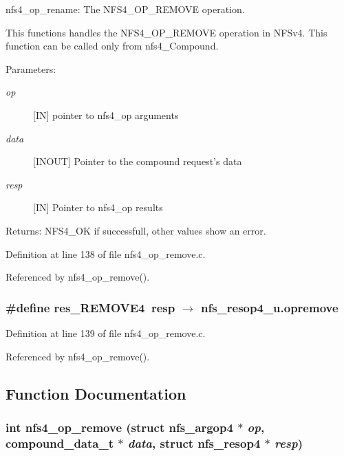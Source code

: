 nfs4\_\-op\_\-rename: The NFS4\_\-OP\_\-REMOVE operation.

This functions handles the NFS4\_\-OP\_\-REMOVE operation in NFSv4. This function can be called only from nfs4\_\-Compound.

\begin{Desc}
\item[Parameters:]
\begin{description}
\item[{\em op}][IN] pointer to nfs4\_\-op arguments \item[{\em data}][INOUT] Pointer to the compound request's data \item[{\em resp}][IN] Pointer to nfs4\_\-op results\end{description}
\end{Desc}
\begin{Desc}
\item[Returns:]NFS4\_\-OK if successfull, other values show an error. \end{Desc}


Definition at line 138 of file nfs4\_\-op\_\-remove.c.

Referenced by nfs4\_\-op\_\-remove().
\subsubsection{\setlength{\rightskip}{0pt plus 5cm}\#define res\_\-REMOVE4\ resp $\rightarrow$ nfs\_\-resop4\_\-u.opremove}\label{nfs4__op__remove_8c_a1}




Definition at line 139 of file nfs4\_\-op\_\-remove.c.

Referenced by nfs4\_\-op\_\-remove().

\subsection{Function Documentation}
\subsubsection{\setlength{\rightskip}{0pt plus 5cm}int nfs4\_\-op\_\-remove (struct nfs\_\-argop4 $\ast$ {\em op}, compound\_\-data\_\-t $\ast$ {\em data}, struct nfs\_\-resop4 $\ast$ {\em resp})}\label{nfs4__op__remove_8c_a2}





